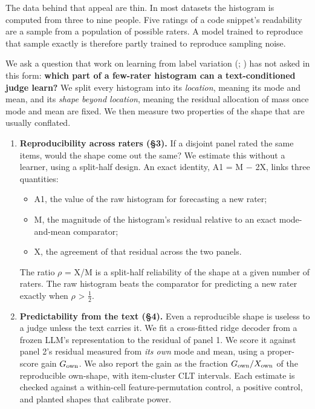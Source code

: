 \documentclass[10pt,twocolumn]{article}
\providecommand{\tightlist}{\setlength{\itemsep}{0pt}\setlength{\parskip}{0pt}}
\begin{document}
The data behind that appeal are thin. In most datasets the histogram is computed from three to nine people. Five ratings of a code snippet's readability are a sample from a population of possible raters. A model trained to reproduce that sample exactly is therefore partly trained to reproduce sampling noise.

We ask a question that work on learning from label variation (\citealp{uma2021learning}; \citealp{plank2022problem}) has not asked in this form: \textbf{which part of a few-rater histogram can a text-conditioned judge learn?} We split every histogram into its \emph{location}, meaning its mode and mean, and its \emph{shape beyond location}, meaning the residual allocation of mass once mode and mean are fixed. We then measure two properties of the shape that are usually conflated.

\begin{enumerate}
\def\labelenumi{\arabic{enumi}.}
\tightlist
\item
  \textbf{Reproducibility across raters (\S{}3).} If a disjoint panel rated the same items, would the shape come out the same? We estimate this without a learner, using a split-half design. An exact identity, A1 = M $-$ 2X, links three quantities:

  \begin{itemize}
  \tightlist
  \item
    A1, the value of the raw histogram for forecasting a new rater;
  \item
    M, the magnitude of the histogram's residual relative to an exact mode-and-mean comparator;
  \item
    X, the agreement of that residual across the two panels.
  \end{itemize}

  The ratio $\rho$ = X/M is a split-half reliability of the shape at a given number of raters. The raw histogram beats the comparator for predicting a new rater exactly when $\rho$ \textgreater{} $\tfrac12$.
\item
  \textbf{Predictability from the text (\S{}4).} Even a reproducible shape is useless to a judge unless the text carries it. We fit a cross-fitted ridge decoder from a frozen LLM's representation to the residual of panel 1. We score it against panel 2's residual measured from \emph{its own} mode and mean, using a proper-score gain \(G_{\rm own}\). We also report the gain as the fraction \(G_{\rm own}/X_{\rm own}\) of the reproducible own-shape, with item-cluster CLT intervals. Each estimate is checked against a within-cell feature-permutation control, a positive control, and planted shapes that calibrate power.
\end{enumerate}
\end{document}
